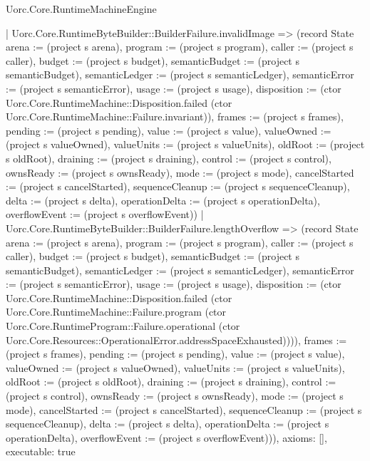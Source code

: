 \begin{lexlean}{Uorc.Core.RuntimeMachineEngine}
\begin{semanticmodule}
{    | Uorc.Core.RuntimeByteBuilder::BuilderFailure.invalidImage => (record State {arena := (project s arena), program := (project s program), caller := (project s caller), budget := (project s budget), semanticBudget := (project s semanticBudget), semanticLedger := (project s semanticLedger), semanticError := (project s semanticError), usage := (project s usage), disposition := (ctor Uorc.Core.RuntimeMachine::Disposition.failed (ctor Uorc.Core.RuntimeMachine::Failure.invariant)), frames := (project s frames), pending := (project s pending), value := (project s value), valueOwned := (project s valueOwned), valueUnits := (project s valueUnits), oldRoot := (project s oldRoot), draining := (project s draining), control := (project s control), ownsReady := (project s ownsReady), mode := (project s mode), cancelStarted := (project s cancelStarted), sequenceCleanup := (project s sequenceCleanup), delta := (project s delta), operationDelta := (project s operationDelta), overflowEvent := (project s overflowEvent)})
    | Uorc.Core.RuntimeByteBuilder::BuilderFailure.lengthOverflow => (record State {arena := (project s arena), program := (project s program), caller := (project s caller), budget := (project s budget), semanticBudget := (project s semanticBudget), semanticLedger := (project s semanticLedger), semanticError := (project s semanticError), usage := (project s usage), disposition := (ctor Uorc.Core.RuntimeMachine::Disposition.failed (ctor Uorc.Core.RuntimeMachine::Failure.program (ctor Uorc.Core.RuntimeProgram::Failure.operational (ctor Uorc.Core.Resources::OperationalError.addressSpaceExhausted)))), frames := (project s frames), pending := (project s pending), value := (project s value), valueOwned := (project s valueOwned), valueUnits := (project s valueUnits), oldRoot := (project s oldRoot), draining := (project s draining), control := (project s control), ownsReady := (project s ownsReady), mode := (project s mode), cancelStarted := (project s cancelStarted), sequenceCleanup := (project s sequenceCleanup), delta := (project s delta), operationDelta := (project s operationDelta), overflowEvent := (project s overflowEvent)})),
  axioms: [],
  executable: true
}


\end{semanticmodule}
\end{lexlean}
